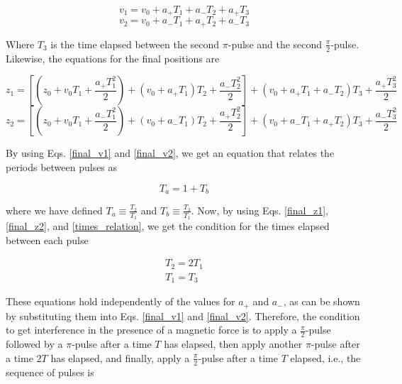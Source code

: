 \documentclass{article}
\begin{document}
\begin{equation}\label{final_v1}
v_{1} = v_{0} + a_{+} T_{1} + a_{-} T_{2} + a_{+} T_{3}
\end{equation}
\begin{equation}\label{final_v2}
v_{2} = v_{0} + a_{-} T_{1} + a_{+} T_{2} + a_{-} T_{3}
\end{equation}

Where $T_{3}$ is the time elapsed between the second $\pi$-pulse and the second $\frac{\pi}{2}$-pulse. Likewise, the equations for the final positions are

\begin{equation}\label{final_z1}
z_{1} = [(z_{0} + v_{0} T_{1} + \frac{a_{+} T^{2}_{1}}{2}) + (v_{0} + a_{+}T_{1})T_{2} + \frac{a_{-} T^{2}_{2}}{2}] + (v_{0}+a_{+}T_{1} + a_{-}T_{2})T_{3} + \frac{a_{+} T^{2}_{3}}{2}
\end{equation}
\begin{equation}\label{final_z2}
z_{2} = [(z_{0} + v_{0} T_{1} + \frac{a_{-} T^{2}_{1}}{2}) + (v_{0} + a_{-}T_{1})T_{2} + \frac{a_{+} T^{2}_{2}}{2}] + (v_{0}+a_{-}T_{1} + a_{+}T_{2})T_{3} + \frac{a_{-} T^{2}_{3}}{2}
\end{equation}

By using Eqs. \ref{final_v1} and \ref{final_v2}, we get an equation that relates the periods between pulses as

\begin{equation}\label{times_relation}
T_{a} = 1 + T_{b}
\end{equation}

where we have defined $T_{a} \equiv \frac{T_{2}}{T_{1}}$ and $T_{b} \equiv \frac{T_{3}}{T_{1}}$. Now, by using Eqs. \ref{final_z1}, \ref{final_z2}, and \ref{times_relation}, we get the condition for the times elapsed between each pulse

\begin{equation}
\begin{aligned}
T_{2} = 2T_{1} \\
T_{1} = T_{3}
\end{aligned}
\end{equation}

These equations hold independently of the values for $a_{+}$ and $a_{-}$, as can be shown by substituting them into Eqs. \ref{final_v1} and \ref{final_v2}. Therefore, the condition to get interference in the presence of a magnetic force is to apply a 
$\frac{\pi}{2}$-pulse followed by a $\pi$-pulse after a time $T$ has elapsed, then apply another $\pi$-pulse after a time $2T$ has elapsed, and finally, apply a $\frac{\pi}{2}$-pulse after a time $T$ elapsed, i.e., the sequence of pulses is
\end{document}
